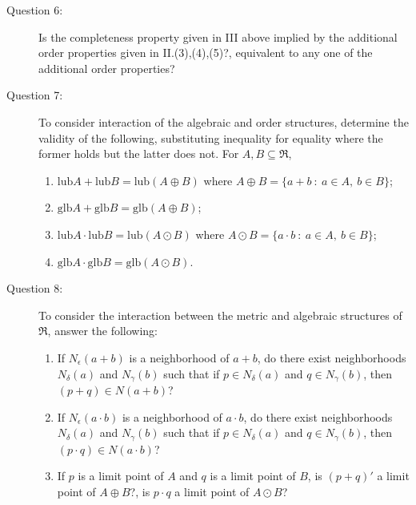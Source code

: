 \documentclass{article}
\begin{document}
\begin{description}

  \item[Question 6:] Is the completeness property given in III above implied by the additional order properties given in II.(3),(4),(5)?, equivalent to any one of the additional order properties?

  \item[Question 7:] To consider interaction of the algebraic and order structures, determine the validity of the following, substituting inequality for equality where the former holds but the latter does not. For $A,B \subseteq \Re$,
    \begin{enumerate}[\hspace{1cm}(1)]
      \item $\text{lub}A + \text{lub}B = \text{lub}(A \oplus B)$ where $A \oplus B = \{ a+b\ :\ a \in A,\ b \in B \}$;
      \item $\text{glb}A + \text{glb}B = \text{glb}(A \oplus B)$;
      \item $\text{lub}A \cdot \text{lub}B = \text{lub}(A \odot B)$ where $A \odot B = \{ a \cdot b\ :\ a \in A,\ b \in B \}$;
      \item $\text{glb}A \cdot \text{glb}B = \text{glb}(A \odot B)$.
    \end{enumerate}

  \item[Question 8:] To consider the interaction between the metric and algebraic structures of $\Re$, answer the following:
    \begin{enumerate}[\hspace{1cm}(1)]
      \item If $N_\epsilon (a+b)$ is a neighborhood of $a+b$, do there exist neighborhoods $N_\delta (a)$ and $N_\gamma (b)$ such that if $p \in N_\delta (a)$ and $q \in N_\gamma (b)$, then $(p+q) \in N (a+b)$?
      \item If $N_\epsilon (a \cdot b)$ is a neighborhood of $a \cdot b$, do there exist neighborhoods $N_\delta (a)$ and $N_\gamma (b)$ such that if $p \in N_\delta (a)$ and $q \in N_\gamma (b)$, then $(p \cdot q) \in N (a \cdot b)$?
      \item If $p$ is a limit point of $A$ and $q$ is a limit point of $B$, is $(p+q)'$ a limit point of $A \oplus B$?, is $p \cdot q$ a limit point of $A \odot B$?
    \end{enumerate}

\end{description}
\end{document}
